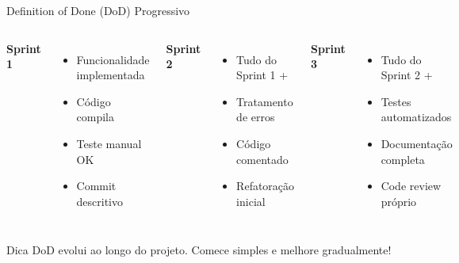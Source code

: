 \documentclass[10pt]{beamer}
\begin{document}
\begin{frame}{Definition of Done (DoD) Progressivo}
\begin{columns}[t]
\textbf{Sprint 1}
\begin{itemize}
    \item Funcionalidade implementada
    \item Código compila
    \item Teste manual OK
    \item Commit descritivo
\end{itemize}

\textbf{Sprint 2}
\begin{itemize}
    \item Tudo do Sprint 1 +
    \item Tratamento de erros
    \item Código comentado
    \item Refatoração inicial
\end{itemize}

\textbf{Sprint 3}
\begin{itemize}
    \item Tudo do Sprint 2 +
    \item Testes automatizados
    \item Documentação completa
    \item Code review próprio
\end{itemize}
\end{columns}

\vspace{0.5cm}
\begin{alertblock}{Dica}
DoD evolui ao longo do projeto. Comece simples e melhore gradualmente!
\end{alertblock}
\end{frame}
\end{document}
